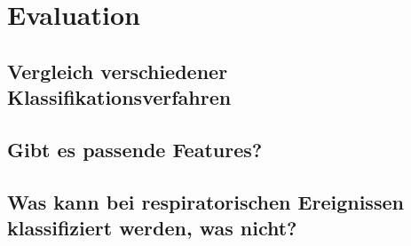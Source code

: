 
\chapter{Evaluation}
\label{ch:Evaluation}

\section{Vergleich verschiedener Klassifikationsverfahren}
\section{Gibt es passende Features?}
\section{Was kann bei respiratorischen Ereignissen klassifiziert werden, was nicht?}
